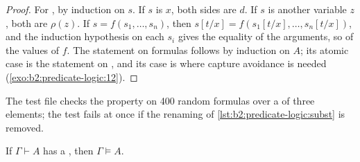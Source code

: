 \begin{proof}
For , by induction on $s$. If $s$ is $x$, both sides are $d$. If $s$ is another variable $z$, both are $\rho(z)$.
If $s = f(s_1, \dots, s_n)$, then $s[t/x] = f(s_1[t/x], \dots, s_n[t/x])$, and the induction hypothesis on each $s_i$
gives the equality of the arguments, so of the values of $f$. The statement on formulas follows by induction on $A$; its
atomic case is the statement on , and its  case is where capture avoidance is needed
(\cref{exo:b2:predicate-logic:12}).
\end{proof}

The test file  checks the property on 400 random formulas over a  of three elements;
the test fails at once if the renaming of \cref{lst:b2:predicate-logic:subst} is removed.

\begin{theorem}\label{thm:b2:predicate-logic:soundness}
If $\Gamma \vdash A$ has a , then $\Gamma \models A$.
\end{theorem}

